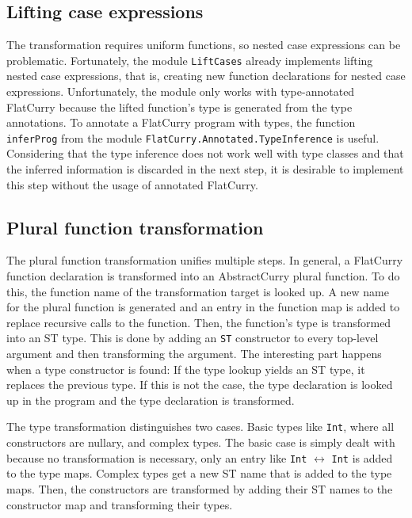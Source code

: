 \documentclass[a4paper, 11pt, fleqn]{scrreprt}
\newcommand{\cinline}[1]{\texttt{#1}}
\begin{document}
\subsection{Lifting case expressions}
The transformation requires uniform functions, so nested case expressions can be problematic. Fortunately, the module \cinline{LiftCases} already implements lifting nested case expressions, that is, creating new function declarations for nested case expressions. Unfortunately, the module only works with type-annotated FlatCurry because the lifted function's type is generated from the type annotations. To annotate a FlatCurry program with types, the function \cinline{inferProg} from the module \cinline{FlatCurry.Annotated.TypeInference} is useful. Considering that the type inference does not work well with type classes and that the inferred information is discarded in the next step, it is desirable to implement this step without the usage of annotated FlatCurry.

\subsection{Plural function transformation}
\label{plural}
The plural function transformation unifies multiple steps. In general, a FlatCurry function declaration is transformed into an AbstractCurry plural function. To do this, the function name of the transformation target is looked up. A new name for the plural function is generated and an entry in the function map is added to replace recursive calls to the function. Then, the function's type is transformed into an ST type. This is done by adding an \cinline{ST} constructor to every top-level argument and then transforming the argument. The interesting part happens when a type constructor is found: If the type lookup yields an ST type, it replaces the previous type. If this is not the case, the type declaration is looked up in the program and the type declaration is transformed.

The type transformation distinguishes two cases. Basic types like \cinline{Int}, where all constructors are nullary, and complex types. The basic case is simply dealt with because no transformation is necessary, only an entry like \cinline{Int} $\longleftrightarrow$ \cinline{Int} is added to the type maps. Complex types get a new ST name that is added to the type maps. Then, the constructors are transformed by adding their ST names to the constructor map and transforming their types.
\end{document}
